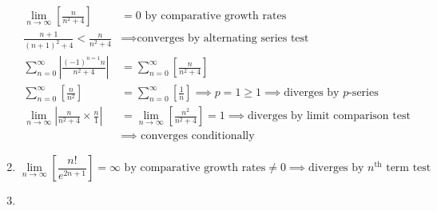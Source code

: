 \documentclass[12pt, A4]{report}
\begin{document}
\begin{enumerate}
\begin{align*}
						\lim_{n\to\infty}\left[\frac{n}{n^2 + 4}\right] &= 0 \text{ by comparative growth rates} \\
						\frac{n + 1}{(n + 1)^2 + 4} < \frac{n}{n^2 + 4} &\implies \text{converges by alternating series test} \\
						\sum_{n = 0}^\infty\left|\frac{(-1)^{n = 1}n}{n^2 + 4}\right| &= \sum_{n = 0}^\infty\left[\frac{n}{n^2 + 4}\right] \\
						\sum_{n = 0}^\infty\left[\frac{n}{n^2}\right] &= \sum_{n = 0}^\infty\left[\frac{1}{n}\right]
								\implies p = 1 \ge 1 \implies \text{diverges by $p$-series} \\
						\lim_{n\to\infty}\left|\frac{n}{n^2 + 4} \times \frac{n}{1}\right| &= \lim_{n\to\infty}\left[\frac{n^2}{n^2 + 4}\right] 
								= 1
								\implies \text{diverges by limit comparison test} \\
							&\implies \text{ converges conditionally}
					\end{align*}
				\item
					\[\lim_{n\to\infty}\left[\frac{n!}{e^{2n + 1}}\right] = \infty \text{ by comparative growth rates} \ne 0 \implies \text{diverges by $n^{\text{th}}$ term test}\]
				\item
					
			\end{enumerate}
\end{document}
